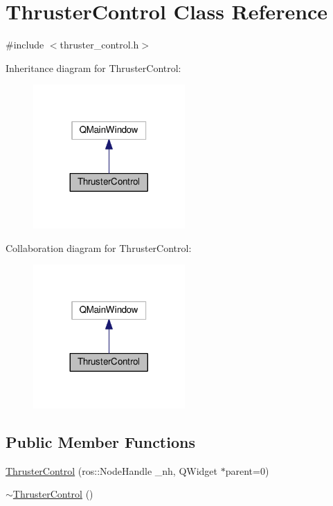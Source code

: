 \hypertarget{classThrusterControl}{}\section{Thruster\+Control Class Reference}
\label{classThrusterControl}


{\ttfamily \#include $<$thruster\+\_\+control.\+h$>$}



Inheritance diagram for Thruster\+Control\+:
\nopagebreak
\begin{figure}[H]
\begin{center}
\leavevmode
\includegraphics[width=164pt]{classThrusterControl__inherit__graph}
\end{center}
\end{figure}


Collaboration diagram for Thruster\+Control\+:
\nopagebreak
\begin{figure}[H]
\begin{center}
\leavevmode
\includegraphics[width=164pt]{classThrusterControl__coll__graph}
\end{center}
\end{figure}
\subsection*{Public Member Functions}
\begin{DoxyCompactItemize}
\item 
\hyperlink{classThrusterControl_a88e603d8a1fa620a60a9989cce8e4c87}{Thruster\+Control} (ros\+::\+Node\+Handle \+\_\+nh, Q\+Widget $\ast$parent=0)
\item 
\hyperlink{classThrusterControl_a2d6947c1e460086a6bbfbee2b1bd86e8}{$\sim$\+Thruster\+Control} ()
\end{DoxyCompactItemize}
